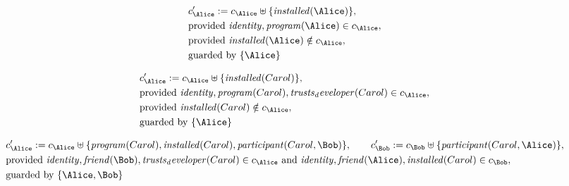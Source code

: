 \begin{align*}
&
c'_
{
\Alice
}
 := 
c_
{
\Alice
}
 \uplus 
\{
\mathit{
installed
}
(
\Alice
)
\}
,\\
&
\text{provided } 
\mathit{
identity
}
,
\mathit{
program
}
(
\Alice
)
 \in c_
{
\Alice
}
,\\
&
\text{provided } 
\mathit{
installed
}
(
\Alice
)
 \notin c_
{
\Alice
}
,\\
&
\text{guarded by } \{
\Alice
\}
\end{align*}

\begin{align*}
&
c'_
{
\Alice
}
 := 
c_
{
\Alice
}
 \uplus 
\{
\mathit{
installed
}
(
Carol
)
\}
,\\
&
\text{provided } 
\mathit{
identity
}
,
\mathit{
program
}
(
Carol
)
,
\mathit{
trusts_developer
}
(
Carol
)
 \in c_
{
\Alice
}
,\\
&
\text{provided } 
\mathit{
installed
}
(
Carol
)
 \notin c_
{
\Alice
}
,\\
&
\text{guarded by } \{
\Alice
\}
\end{align*}

\begin{align*}
&
c'_
{
\Alice
}
 := 
c_
{
\Alice
}
 \uplus 
\{
\mathit{
program
}
(
Carol
)
,
\mathit{
installed
}
(
Carol
)
,
\mathit{
participant
}
(
Carol
,
\Bob
)
\}
, \qquad 
c'_
{
\Bob
}
 := 
c_
{
\Bob
}
 \uplus 
\{
\mathit{
participant
}
(
Carol
,
\Alice
)
\}
,\\
&
\text{provided } 
\mathit{
identity
}
,
\mathit{
friend
}
(
\Bob
)
,
\mathit{
trusts_developer
}
(
Carol
)
 \in c_
{
\Alice
}
 \text{ and } 
\mathit{
identity
}
,
\mathit{
friend
}
(
\Alice
)
,
\mathit{
installed
}
(
Carol
)
 \in c_
{
\Bob
}
,\\
&
\text{guarded by } \{
\Alice
,
\Bob
\}
\end{align*}

